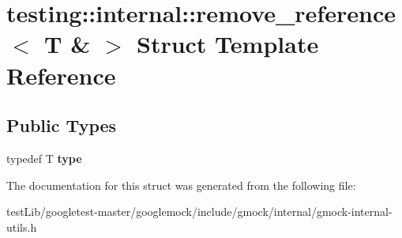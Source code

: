 \hypertarget{structtesting_1_1internal_1_1remove__reference_3_01T_01_6_01_4}{}\section{testing\+:\+:internal\+:\+:remove\+\_\+reference$<$ T \& $>$ Struct Template Reference}
\label{structtesting_1_1internal_1_1remove__reference_3_01T_01_6_01_4}
\subsection*{Public Types}
\begin{DoxyCompactItemize}
\item 
\mbox{\label{structtesting_1_1internal_1_1remove__reference_3_01T_01_6_01_4_a0d72f004f54016a47c752a82be352a19}} 
typedef T {\bfseries type}
\end{DoxyCompactItemize}


The documentation for this struct was generated from the following file\+:\begin{DoxyCompactItemize}
\item 
test\+Lib/googletest-\/master/googlemock/include/gmock/internal/gmock-\/internal-\/utils.\+h\end{DoxyCompactItemize}
